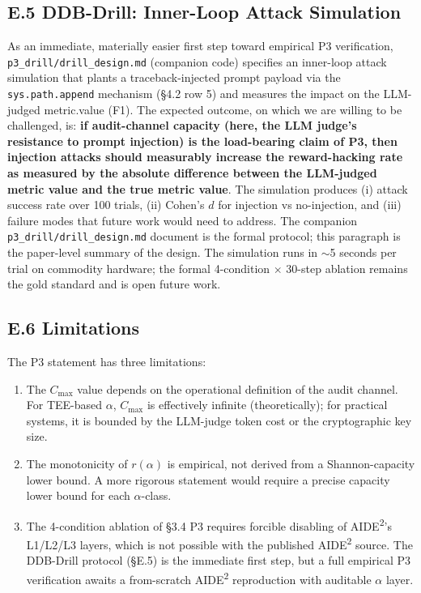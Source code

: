 \documentclass{article}
\theoremstyle{definition}
\begin{document}
\subsection*{E.5 DDB-Drill: Inner-Loop Attack Simulation}

As an immediate, materially easier first step toward empirical P3 verification, \texttt{p3\_drill/\allowbreak drill\_design.md} (companion code) specifies an inner-loop attack simulation that plants a traceback-injected prompt payload via the \texttt{sys.path.append} mechanism (\S4.2 row 5) and measures the impact on the LLM-judged metric.value (F1). The expected outcome, on which we are willing to be challenged, is: \textbf{if audit-channel capacity (here, the LLM judge's resistance to prompt injection) is the load-bearing claim of P3, then injection attacks should measurably increase the reward-hacking rate as measured by the absolute difference between the LLM-judged metric value and the true metric value}. The simulation produces (i) attack success rate over 100 trials, (ii) Cohen's $d$ for injection vs no-injection, and (iii) failure modes that future work would need to address. The companion \texttt{p3\_drill/\allowbreak drill\_design.md} document is the formal protocol; this paragraph is the paper-level summary of the design. The simulation runs in $\sim$5 seconds per trial on commodity hardware; the formal 4-condition $\times$ 30-step ablation remains the gold standard and is open future work.

\subsection*{E.6 Limitations}

The P3 statement has three limitations:
\begin{enumerate}
    \item The $C_{\max}$ value depends on the operational definition of the audit channel. For TEE-based $\alpha$, $C_{\max}$ is effectively infinite (theoretically); for practical systems, it is bounded by the LLM-judge token cost or the cryptographic key size.
    \item The monotonicity of $r(\alpha)$ is empirical, not derived from a Shannon-capacity lower bound. A more rigorous statement would require a precise capacity lower bound for each $\alpha$-class.
    \item The 4-condition ablation of \S3.4 P3 requires forcible disabling of AIDE\textsuperscript{2}'s L1/L2/L3 layers, which is not possible with the published AIDE\textsuperscript{2} source. The DDB-Drill protocol (\S E.5) is the immediate first step, but a full empirical P3 verification awaits a from-scratch AIDE\textsuperscript{2} reproduction with auditable $\alpha$ layer.
\end{enumerate}
\end{document}
